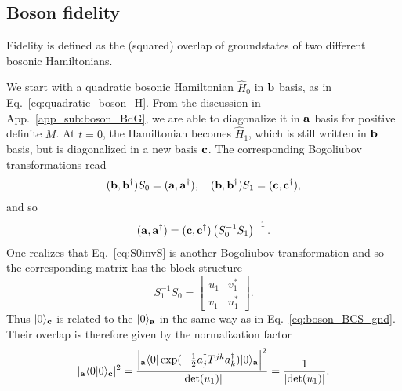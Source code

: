 \subsection{Boson fidelity} 
\label{app_sub:boson_fidelity}

Fidelity is defined as the (squared) overlap of groundstates of two different bosonic Hamiltonians. 

We start with a quadratic bosonic Hamiltonian $\hat{H}_0$ in ${\bf b}$ basis, as in Eq.~\eqref{eq:quadratic_boson_H}. From the discussion in App.~\ref{app_sub:boson_BdG}, we are able to diagonalize it in ${\bf a}$ basis for positive definite $M$. At $t=0$, the Hamiltonian becomes $\hat{H}_1$, which is still written in ${\bf b}$ basis, but is diagonalized in a new basis ${\bf c}$. The corresponding Bogoliubov transformations read
\begin{equation}\begin{aligned}
\label{eq:two_BdG}
({\bf b} , {\bf b}^\dagger)S_0=({\bf a} , {\bf a}^\dagger),\quad
({\bf b} , {\bf b}^\dagger)S_1=({\bf c} , {\bf c}^\dagger),
\end{aligned}\end{equation}
and so
\begin{equation}\begin{aligned}
\label{eq:S0invS}
({\bf a} , {\bf a}^\dagger)=({\bf c} , {\bf c}^\dagger)\left(S_0^{-1}S_1\right)^{-1}.
\end{aligned}\end{equation}
One realizes that Eq.~\eqref{eq:S0invS} is another Bogoliubov transformation and so the corresponding matrix has the block structure
\begin{equation}
S_1^{-1}S_0=\begin{bmatrix}
u_1 & v_1^*\\
v_1 & u_1^*
\end{bmatrix}.
\end{equation}
Thus $|0\rangle_{\bf c}$ is related to the $|0\rangle_{{\bf a}}$ in the same way as in Eq.~\eqref{eq:boson_BCS_gnd}. Their overlap is therefore given by the normalization factor
\begin{equation}\begin{aligned}
|{}_{\bf a}\langle0|0\rangle_{\bf c}|^2=\frac{\Big|{}_{\bf a}\langle 0 | \exp( -\frac{1}{2} a_j^{\dagger} T^{jk} a_k^{\dagger} )|0   \rangle_{\bf a} \Big|^2}{|\text{det}(u_1)|} = \frac{1}{|\text{det}(u_1)|}.
\end{aligned}\end{equation}

